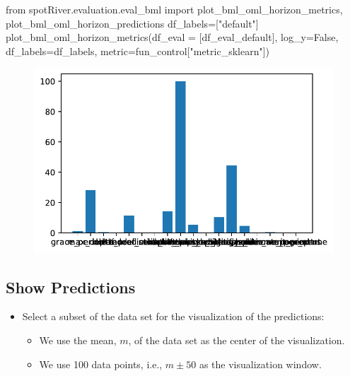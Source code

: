 \documentclass[
  letterpaper,
  DIV=11,
  numbers=noendperiod]{scrreprt}
\newenvironment{Shaded}{\begin{snugshade}}{\end{snugshade}}
\newcommand{\ImportTok}[1]{\textcolor[rgb]{0.00,0.46,0.62}{#1}}
\newcommand{\NormalTok}[1]{\textcolor[rgb]{0.00,0.23,0.31}{#1}}
\newcommand{\OperatorTok}[1]{\textcolor[rgb]{0.37,0.37,0.37}{#1}}
\newcommand{\StringTok}[1]{\textcolor[rgb]{0.13,0.47,0.30}{#1}}
\newcommand{\VariableTok}[1]{\textcolor[rgb]{0.07,0.07,0.07}{#1}}
\providecommand{\tightlist}{%
  \setlength{\itemsep}{0pt}\setlength{\parskip}{0pt}}\usepackage{longtable,booktabs,array}
\begin{document}
\begin{Shaded}
\begin{Highlighting}[]
\ImportTok{from}\NormalTok{ spotRiver.evaluation.eval\_bml }\ImportTok{import}\NormalTok{ plot\_bml\_oml\_horizon\_metrics, plot\_bml\_oml\_horizon\_predictions}
\NormalTok{df\_labels}\OperatorTok{=}\NormalTok{[}\StringTok{"default"}\NormalTok{]}
\NormalTok{plot\_bml\_oml\_horizon\_metrics(df\_eval }\OperatorTok{=}\NormalTok{ [df\_eval\_default], log\_y}\OperatorTok{=}\VariableTok{False}\NormalTok{, df\_labels}\OperatorTok{=}\NormalTok{df\_labels, metric}\OperatorTok{=}\NormalTok{fun\_control[}\StringTok{"metric\_sklearn"}\NormalTok{])}
\end{Highlighting}
\end{Shaded}

\begin{figure}[H]

{\centering \includegraphics{024_spot_hpt_river_friedman_hatr_files/figure-pdf/cell-29-output-1.pdf}

}

\end{figure}

\hypertarget{show-predictions}{%
\subsection{Show Predictions}\label{show-predictions}}

\begin{itemize}
\tightlist
\item
  Select a subset of the data set for the visualization of the
  predictions:

  \begin{itemize}
  \tightlist
  \item
    We use the mean, \(m\), of the data set as the center of the
    visualization.
  \item
    We use 100 data points, i.e., \(m \pm 50\) as the visualization
    window.
  \end{itemize}
\end{itemize}
\end{document}
